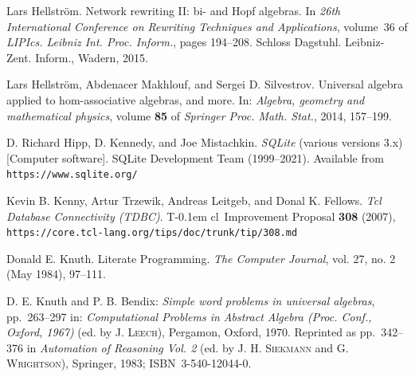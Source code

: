 \documentclass{article}
\theoremstyle{definition}
\newcommand{\Tcl}{T\kern-0.1em cl}
\providecommand{\url}[1]{\texttt{#1}}
\begin{document}
\begin{thebibliography}{99}
   Lars Hellstr\"{o}m.
   \newblock Network rewriting {II}: bi- and {H}opf algebras.
   \newblock In {\em 26th {I}nternational {C}onference on {R}ewriting {T}echniques
     and {A}pplications}, volume~36 of {\em LIPIcs. Leibniz Int. Proc. Inform.},
     pages 194--208. Schloss Dagstuhl. Leibniz-Zent. Inform., Wadern, 2015.

  Lars Hellstr\"om, Abdenacer Makhlouf, and Sergei D. Silvestrov.
  Universal algebra applied to hom-associative algebras, and more.
  In: \textit{Algebra, geometry and mathematical physics}, 
  volume \textbf{85} of \textit{Springer Proc. Math. Stat.}, 
  2014, 157--199.

  D. Richard Hipp, D. Kennedy, and Joe Mistachkin.
  \textit{SQLite} (various versions 3.x) [Computer software]. 
  SQLite Development Team (1999--2021).
  Available from \url{https://www.sqlite.org/}

  Kevin B. Kenny, Artur Trzewik, Andreas Leitgeb, and Donal K. 
  Fellows.
  \textit{Tcl Database Connectivity (TDBC)}.
  \Tcl\ Improvement Proposal \textbf{308} (2007),
  \url{https://core.tcl-lang.org/tips/doc/trunk/tip/308.md}

  Donald E. Knuth. 
  Literate Programming.
  \textit{The Computer Journal}, vol. 27, no. 2 (May 1984), 97--111.

   D. E. Knuth and P. B. Bendix:
   \textit{Simple word problems in universal algebras},
   pp.~263--297 in: 
   \textit{Computational Problems in Abstract Algebra 
     (Proc. Conf., Oxford, 1967)} (ed. by \textsc{J. Leech}),
   Pergamon, Oxford, 1970.
   Reprinted as pp.~342--376 in \textit{Automation of Reasoning Vol. 2} 
   (ed. by \textsc{J. H. Siekmann} and \textsc{G. Wrightson}), 
   Springer, 1983; 
   ISBN~3-540-12044-0.



\end{thebibliography}
\end{document}
